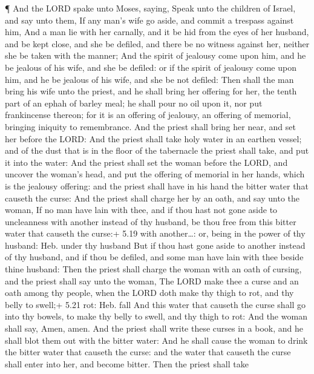  ¶ And the LORD spake unto Moses, saying, 
Speak unto the children of Israel, and say unto them, If any man's wife
go aside, and commit a trespass against him,  And a man lie
with her carnally, and it be hid from the eyes of her husband, and be
kept close, and she be defiled, and there be no witness against her,
neither she be taken with the manner;  And the spirit of
jealousy come upon him, and he be jealous of his wife, and she be
defiled: or if the spirit of jealousy come upon him, and he be jealous
of his wife, and she be not defiled:  Then shall the man
bring his wife unto the priest, and he shall bring her offering for her,
the tenth part of an ephah of barley meal; he shall pour no oil upon it,
nor put frankincense thereon; for it is an offering of jealousy, an
offering of memorial, bringing iniquity to remembrance. 
And the priest shall bring her near, and set her before the LORD:
 And the priest shall take holy water in an earthen vessel;
and of the dust that is in the floor of the tabernacle the priest shall
take, and put it into the water:  And the priest shall set
the woman before the LORD, and uncover the woman's head, and put the
offering of memorial in her hands, which is the jealousy offering: and
the priest shall have in his hand the bitter water that causeth the
curse:  And the priest shall charge her by an oath, and say
unto the woman, If no man have lain with thee, and if thou hast not gone
aside to uncleanness with another instead of thy husband, be thou free
from this bitter water that causeth the curse:+ 5.19 with another\ldots:
or, being in the power of thy husband: Heb. under thy husband
 But if thou hast gone aside to another instead of thy
husband, and if thou be defiled, and some man have lain with thee beside
thine husband:  Then the priest shall charge the woman with
an oath of cursing, and the priest shall say unto the woman, The LORD
make thee a curse and an oath among thy people, when the LORD doth make
thy thigh to rot, and thy belly to swell;+ 5.21 rot: Heb. fall
 And this water that causeth the curse shall go into thy
bowels, to make thy belly to swell, and thy thigh to rot: And the woman
shall say, Amen, amen.  And the priest shall write these
curses in a book, and he shall blot them out with the bitter water:
 And he shall cause the woman to drink the bitter water
that causeth the curse: and the water that causeth the curse shall enter
into her, and become bitter.  Then the priest shall take
